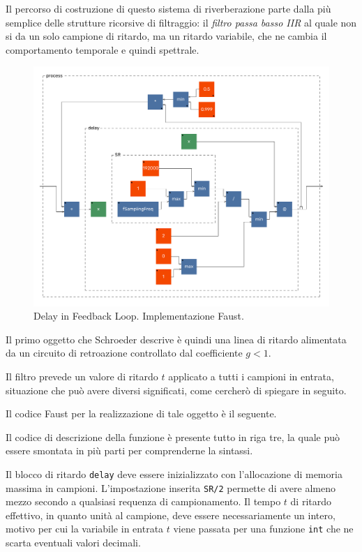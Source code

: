 \begin{refsection}
Il percorso di costruzione di questo sistema di riverberazione parte dalla
più semplice delle strutture ricorsive di filtraggio: il
\emph{filtro passa basso IIR} al quale non si da un solo campione di ritardo,
ma un ritardo variabile, che ne cambia il comportamento temporale e quindi
spettrale.

\begin{figure}[t!]
  \centering
  \includegraphics[width=\textwidth]{CAPITOLI/0500/CODES/REV/dfl-svg/process.pdf}
  \caption[]{Delay in Feedback Loop. Implementazione Faust.}
  \label{faust:dfl}
\end{figure}

Il primo oggetto che Schroeder descrive è quindi una linea di ritardo
alimentata da un circuito di retroazione controllato dal coefficiente $g < 1$.

Il filtro prevede un valore di ritardo $t$ applicato a tutti i campioni in
entrata, situazione che può avere diversi significati, come cercherò di spiegare
in seguito.

Il codice Faust per la realizzazione di tale oggetto è il seguente.



Il codice di descrizione della funzione è presente tutto in riga tre, la quale
può essere smontata in più parti per comprenderne la sintassi.

Il blocco di ritardo \texttt{delay} deve essere inizializzato con l'allocazione
di memoria massima in campioni. L'impostazione inserita \texttt{SR/2} permette
di avere almeno mezzo secondo a qualsiasi requenza di campionamento. Il tempo
$t$ di ritardo effettivo, in quanto unità al campione, deve essere necessariamente
un intero, motivo per cui la variabile in entrata $t$ viene passata per una
funzione \texttt{int} che ne scarta eventuali valori decimali.


\end{refsection}
